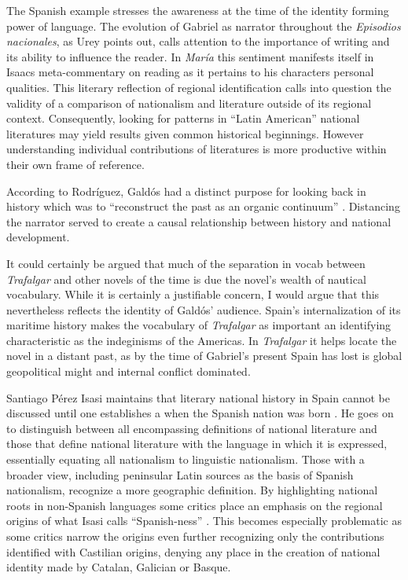 \documentclass[12pt]{report}
\begin{document}
The Spanish example stresses the awareness at the time of the identity forming power of language. The evolution of Gabriel as narrator throughout the \textit{Episodios nacionales}, as Urey points out, calls attention to the importance of writing and its ability to influence the reader. In \textit{María} this sentiment manifests itself in Isaacs meta-commentary on reading as it pertains to his characters personal qualities. This literary reflection of regional identification calls into question the validity of a comparison of nationalism and literature outside of its regional context. Consequently, looking for patterns in \enquote{Latin American} national literatures may yield results given common historical beginnings. However understanding individual contributions of literatures is more productive within their own frame of reference.



According to Rodríguez, Galdós had a distinct purpose for looking back in history which was to \enquote{reconstruct the past as an organic continuum} \cite[28]{Rodriguez1967}.
Distancing the narrator served to create a causal relationship between history and national development.


It could certainly be argued that much of the separation in vocab between \textit{Trafalgar} and other novels of the time is due the novel's wealth of nautical vocabulary.
While it is certainly a justifiable concern, I would argue that this nevertheless reflects the identity of  Galdós' audience.
Spain's internalization of its maritime history makes the vocabulary of \textit{Trafalgar} as important an identifying characteristic as the indeginisms of the Americas.
In \textit{Trafalgar} it helps locate the novel in a distant past, as by the time of Gabriel's present Spain has lost is global geopolitical might and internal conflict dominated.


Santiago Pérez Isasi maintains that literary national history in Spain cannot be discussed until one establishes a when the Spanish nation was born \cite[172]{Isasi2013}.
He goes on to distinguish between all encompassing definitions of national literature and those that define national literature with the language in which it is expressed, essentially equating all nationalism to linguistic nationalism. 
Those with a broader view, including peninsular Latin sources as the basis of Spanish nationalism, recognize a more geographic definition.
By highlighting national roots in non-Spanish languages some critics place an emphasis on the regional origins of what Isasi calls \enquote{Spanish-ness} \cite[173]{Isasi2013}.
This becomes especially problematic as some critics narrow the origins even further recognizing only the contributions identified with Castilian origins, denying any place in the creation of national identity made by Catalan, Galician or Basque.
\end{document}
